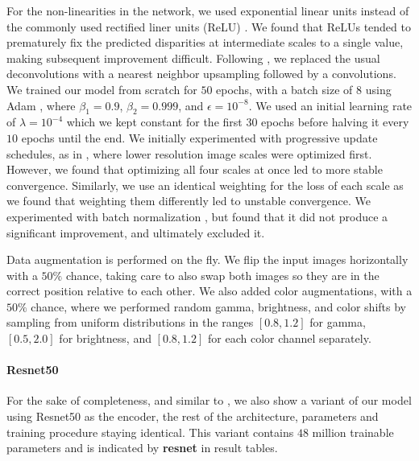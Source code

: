 \documentclass[10pt,twocolumn,letterpaper]{article}
\begin{document}
For the non-linearities in the network, we used exponential linear units \cite{elus} instead of the commonly used rectified liner units (ReLU) \cite{nair2010rectified}. 
We found that ReLUs tended to prematurely fix the predicted disparities at intermediate scales to a single value, making subsequent improvement difficult. Following \cite{odena2016deconvolution}, we replaced the usual deconvolutions with a nearest neighbor upsampling followed by a convolutions.
We trained our model from scratch for $50$ epochs, with a batch size of $8$ using Adam \cite{adamsolver}, where $\beta_1 = 0.9$, $\beta_2 = 0.999$, and $\epsilon = 10^{-8}$. 
We used an initial learning rate of $\lambda = 10^{-4}$ which we kept constant for the first $30$ epochs before halving it every $10$ epochs until the end.
We initially experimented with progressive update schedules, as in \cite{mayer2015large}, where lower resolution image scales were optimized first.
However, we found that optimizing all four scales at once led to more stable convergence.
Similarly, we use an identical weighting for the loss of each scale as we found that weighting them differently led to unstable convergence.
We experimented with batch normalization \cite{ioffe2015batch}, but found that it did not produce a significant improvement, and ultimately excluded it.

Data augmentation is performed on the fly. We flip the input images horizontally with a $50\%$ chance, taking care to also swap both images so they are in the correct position relative to each other.
We also added color augmentations, with a $50\%$ chance, where we performed random gamma, brightness, and color shifts by sampling from uniform distributions in the ranges $[0.8, 1.2]$ for gamma, $[0.5, 2.0]$ for brightness, and $[0.8, 1.2]$ for each color channel separately.

\paragraph{Resnet50} For the sake of completeness, and similar to \cite{laina2016deeper}, we also show a variant of our model using Resnet50 \cite{he2016deep} as the encoder, the rest of the architecture, parameters and training procedure staying identical. This variant contains $48$ million trainable parameters and is indicated by \textbf{resnet} in result tables.
\end{document}
